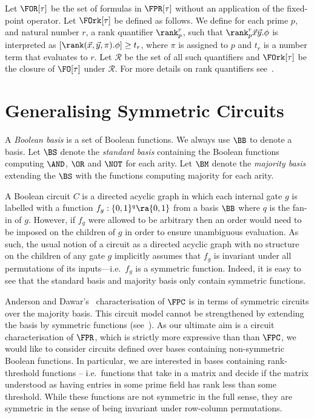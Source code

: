 \documentclass[a4paper,UKenglish]{lipics-v2018}
\begin{document}
Let $\FOR[\tau]$ be the set of formulas in
$\FPR[\tau]$ without an application of the fixed-point operator. Let
$\FOrk[\tau]$ be defined as follows. We define for each prime $p$, and natural
number $r$, a rank quantifier $\rank^r_p$, such that $\rank^r_p\vec{x}\vec{y}.
\phi$ is interpreted as $[\rank (\vec{x}, \vec{y}, \pi) . \phi] \geq t_r$, where
$\pi$ is assigned to $p$ and $t_r$ is a number term that evaluates to $r$. Let
$\mathcal{R}$ be the set of all such quantifiers and $\FOrk[\tau]$ be the
closure of $\FO[\tau]$ under $\mathcal{R}$. For more details on rank quantifiers
see~\cite{Dawar09logicswith}.


\section{Generalising Symmetric Circuits}\label{sec:symm-circ}
A \emph{Boolean basis} is a set of Boolean functions. 
We always use $\BB$ to
denote a basis. Let $\BS$ denote the \emph{standard basis} containing the
Boolean functions computing $\AND$, $\OR$ and $\NOT$ for each arity. Let $\BM$
denote the \emph{majority basis} extending the $\BS$ with the functions
computing majority for each arity. 

A Boolean circuit $C$ is a directed acyclic graph in which each
internal gate $g$ is labelled with a function $f_g : \{0,1\}^q \ra \{0,1\}$ from a basis
$\BB$ where $q$ is the fan-in of $g$.  However, if $f_g$ were allowed to be
arbitrary then an order would need to be imposed on the children of $g$ in order
to ensure unambiguous evaluation.  As such, the usual notion of a circuit as a
directed acyclic graph with no structure on the children of any gate $g$
implicitly assumes that $f_g$ is invariant under all permutations of
its inputs---i.e.\ $f_g$ is a symmetric function.  Indeed, it is easy to see that the
standard basis and majority basis only contain symmetric functions.

Anderson and Dawar's~\cite{AndersonD17} characterisation of $\FPC$ is in terms
of symmetric circuits over the majority basis. This
circuit model cannot be strengthened by extending the basis by symmetric
functions (see~\cite{DW-arxiv}). As our ultimate aim is a circuit characterisation of $\FPR$, which is
strictly more expressive than than $\FPC$, we would like to consider circuits
defined over bases containing non-symmetric Boolean functions. In particular, we
are interested in bases containing rank-threshold functions -- i.e.\ functions
that take in a matrix and decide if the matrix understood as having entries in
some prime field has rank less than some threshold. While these functions are
not symmetric in the full sense, they are symmetric in the sense of being
invariant under row-column permutations.
\end{document}
